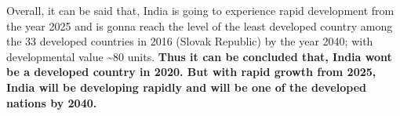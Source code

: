 \documentclass[11pt]{article}
\begin{document}
    Overall, it can be said that, India is going to experience rapid
development from the year 2025 and is gonna reach the level of the least
developed country among the 33 developed countries in 2016 (Slovak
Republic) by the year 2040; with developmental value \textasciitilde{}80
units. \textbf{Thus it can be concluded that, India wont be a developed
country in 2020. But with rapid growth from 2025, India will be
developing rapidly and will be one of the developed nations by 2040.}

    


    
    
    
    
\end{document}
